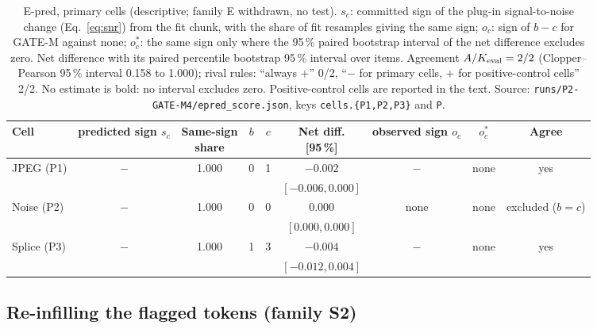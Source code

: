 \begin{table}[!tbp]
\centering
\caption{E-pred, primary cells (descriptive; family E withdrawn, no test). $s_c$: committed sign of the plug-in signal-to-noise change
(Eq.~\eqref{eq:snr}) from the fit chunk, with the share of fit resamples giving the same sign; $o_c$: sign of $b-c$ for GATE-M against
none; $o_c^\ast$: the same sign only where the 95\,\% paired bootstrap interval of the net difference excludes zero. Net difference with
its paired percentile bootstrap 95\,\% interval over items. Agreement $A/K_{\rm eval}=2/2$ (Clopper--Pearson 95\,\% interval 0.158 to
1.000); rival rules: ``always $+$'' 0/2, ``$-$ for primary cells, $+$ for positive-control cells'' 2/2. No estimate is bold: no
interval excludes zero. Positive-control cells are reported in the text. Source: \nolinkurl{runs/P2-GATE-M4/epred_score.json}, keys \nolinkurl{cells.{P1,P2,P3}} and \nolinkurl{P}.}
\label{tab:res_epred}
\footnotesize
\begin{adjustbox}{max width=\textwidth}
\begin{tabular}{lcccccccc}
\toprule
Cell & \makecell{predicted\\sign $s_c$} & \makecell{Same-sign\\share} & $b$ & $c$ & \makecell{Net diff.\\{[95\,\%]}} & \makecell{observed\\sign $o_c$} & $o_c^\ast$ & Agree \\
\midrule
JPEG (P1) & $-$ & 1.000 & 0 & 1 & $-0.002$ & $-$ & none & yes \\
& & & & & \scriptsize$[-0.006,0.000]$ & & & \\
Noise (P2) & $-$ & 1.000 & 0 & 0 & $0.000$ & none & none & \makecell{excluded\\($b=c$)} \\
& & & & & \scriptsize$[0.000,0.000]$ & & & \\
Splice (P3) & $-$ & 1.000 & 1 & 3 & $-0.004$ & $-$ & none & yes \\
& & & & & \scriptsize$[-0.012,0.004]$ & & & \\
\bottomrule
\end{tabular}
\end{adjustbox}
\end{table}

\subsection{Re-infilling the flagged tokens (family S2)}\label{ssec:res_s2}

